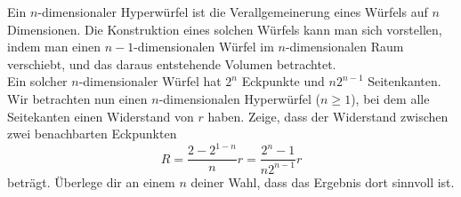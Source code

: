 \begin{Exercise}[label = hypercube, origin = Aaron Wild, difficulty = 5, title = Widerstandswürfel auf LSD]
	Ein $n$-dimensionaler Hyperwürfel ist die Verallgemeinerung eines Würfels auf $n$ Dimensionen. Die Konstruktion eines solchen Würfels kann man sich vorstellen, indem man einen $n-1$-dimensionalen Würfel im $n$-dimensionalen Raum verschiebt, und das daraus entstehende Volumen betrachtet.\\
	Ein solcher $n$-dimensionaler Würfel hat $2^n$ Eckpunkte und $n2^{n-1}$ Seitenkanten.\\
	Wir betrachten nun einen $n$-dimensionalen Hyperwürfel ($n\geq 1$), bei dem alle Seitekanten einen Widerstand von $r$ haben. Zeige, dass der Widerstand zwischen zwei benachbarten Eckpunkten 
	\begin{equation}
		R = \frac{2-2^{1-n}}{n}r = \frac{2^n-1}{n2^{n-1}}r
	\end{equation}
	beträgt. Überlege dir an einem $n$ deiner Wahl, dass das Ergebnis dort sinnvoll ist.
\end{Exercise}